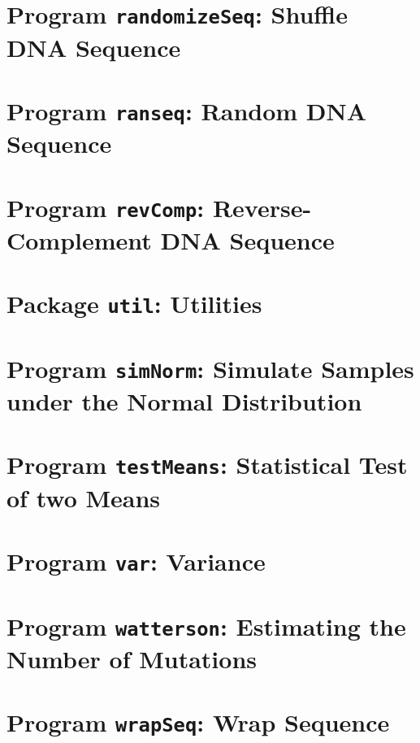 \documentclass[a4paper]{report}
\begin{document}
\chapter{Program \texttt{randomizeSeq}: Shuffle DNA
  Sequence}\label{ch:rs}

\chapter{Program \texttt{ranseq}: Random DNA Sequence}\label{ch:ran}

\chapter{Program \texttt{revComp}: Reverse-Complement DNA
  Sequence}\label{ch:rev}

\chapter{Package \texttt{util}: Utilities}\label{ch:uti}

\chapter{Program \texttt{simNorm}: Simulate Samples under the Normal
  Distribution}\label{ch:sn}

\chapter{Program \texttt{testMeans}: Statistical Test of two Means}\label{ch:tm}

\chapter{Program \texttt{var}: Variance}\label{ch:var}

\chapter{Program \texttt{watterson}: Estimating the Number of Mutations}\label{ch:wat}

\chapter{Program \texttt{wrapSeq}: Wrap Sequence}\label{ch:wra}



\end{document}
